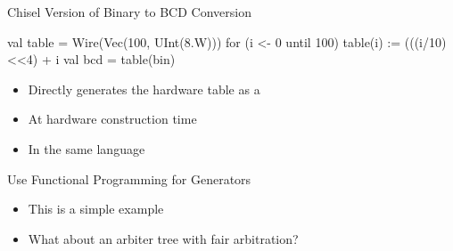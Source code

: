 \begin{frame}[fragile]{Chisel Version of Binary to BCD Conversion}
\begin{chisel}
  val table = Wire(Vec(100, UInt(8.W)))
  for (i <- 0 until 100) {
    table(i) := (((i/10)<<4) + i%
  }
  val bcd = table(bin)
\end{chisel}
\begin{itemize}
\item Directly generates the hardware table as a 
\item At hardware construction time
\item In the same language
\end{itemize}
\end{frame}

\begin{frame}[fragile]{Use Functional Programming for Generators}
\begin{itemize}
\item This is a simple example
\item What about an arbiter tree with fair arbitration?
\end{itemize}
\end{frame}

%


